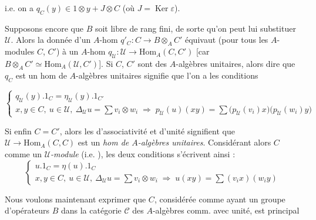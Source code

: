 \documentclass[11pt,a4paper]{article}
\begin{document}

i.e. on a $q_C(y) \in 1 \otimes y + J \otimes C$ (où
$J = \operatorname{Ker} \varepsilon$).

Supposons encore que $B$ soit libre de rang fini, de sorte qu'on peut lui
substituer $\mathcal{U}$. Alors la donnée d'un $A$-hom
$q'_C : C \to B \otimes_A C'$ équivaut (pour tous les $A$-modules $C$, $C'$)
à un $A$-hom $q_{\mathcal{U}} : \mathcal{U} \to \mathrm{Hom}_A(C, C')$ [car
$B \otimes_A C' \simeq \mathrm{Hom}_A(\mathcal{U}, C')$]. Si $C$, $C'$ sont des
$A$-algèbres unitaires, alors dire que $q_C$ est un hom de $A$-algèbres
unitaires signifie que l'on a les conditions


\[
\left\lbrace
\begin{array}{l}
q_{\mathcal{U}}(y) . 1_C = \eta_{\mathcal{U}}(y) . 1_{C'} \\[4pt]
x, y \in C,\ u \in \mathcal{U},\ \Delta_{\mathcal{U}} u = \sum v_i \otimes w_i
\;\Longrightarrow\;
p_{\mathcal{U}}(u)(xy) = \sum \bigl(p_{\mathcal{U}}(v_i) x\bigr)\bigl(p_{\mathcal{U}}(w_i) y\bigr)
\end{array}
\right.
\]

Si enfin $C = C'$, alors \struck{\ill{}} les 
d'associativité et d'unité signifient que 
$\mathcal{U} \to \mathrm{Hom}_A(C, C)$ est un \emph{hom de $A$-algèbres
unitaires}. Considérant alors $C$ comme un \emph{$\mathcal{U}$-module}
 (i.e. \ill{}), les deux conditions 
s'écrivent ainsi :
\[
\left\lbrace
\begin{array}{l}
u . 1_C = \eta(u) . 1_C \\[4pt]
x, y \in C,\ u \in \mathcal{U},\ \Delta_{\mathcal{U}} u = \sum v_i \otimes w_i
\;\Longrightarrow\; u(xy) = \sum (v_i x)(w_i y)
\end{array}
\right.
\]

Nous voulons maintenant exprimer que $C$, considérée comme ayant un groupe
d'opérateurs $B$ dans la catégorie $\mathcal{C}$ des $A$-algèbres comm. avec
unité, est   principal
 
 \struck{\ill{}}               
\end{document}
